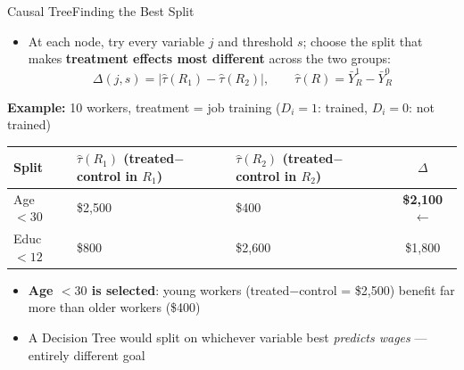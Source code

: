 \documentclass[hyperref={pdfpagelabels=false}]{beamer}
\begin{document}
\begin{frame}{Causal Tree}{Finding the Best Split}
	\begin{itemize}
		\item At each node, try every variable $j$ and threshold $s$; choose the split that makes \textbf{treatment effects most different} across the two groups:
		\[
			\Delta(j,s) = |\hat{\tau}(R_1) - \hat{\tau}(R_2)|, \qquad
			\hat{\tau}(R) = \bar{Y}^{1}_{R} - \bar{Y}^{0}_{R}
		\]
	\end{itemize}
	\vspace{0.1cm}
	\textbf{Example:} 10 workers, treatment = job training ($D_i=1$: trained, $D_i=0$: not trained)
	\vspace{0.1cm}
	\begin{center}
	\small
	\begin{tabular}{lp{2.6cm}p{2.6cm}c}
		\hline
		\textbf{Split} & $\hat{\tau}(R_1)$ \newline (treated$-$control in $R_1$) & $\hat{\tau}(R_2)$ \newline (treated$-$control in $R_2$) & $\Delta$ \\
		\hline
		Age $< 30$  & \$2{,}500 & \$400   & \textbf{\$2{,}100} $\leftarrow$ \\
		Educ $< 12$ & \$800     & \$2{,}600 & \$1{,}800 \\
		\hline
	\end{tabular}
	\end{center}
	\vspace{0.1cm}
	\begin{itemize}
		\item \textbf{Age $< 30$ is selected}: young workers (treated$-$control = \$2,500) benefit far more than older workers (\$400)
		\item A Decision Tree would split on whichever variable best \textit{predicts wages} --- entirely different goal
	\end{itemize}
\end{frame}
\end{document}
